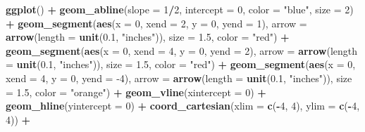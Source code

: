 \documentclass[
]{book}
\newenvironment{Shaded}{\begin{snugshade}}{\end{snugshade}}
\newcommand{\DataTypeTok}[1]{\textcolor[rgb]{0.13,0.29,0.53}{#1}}
\newcommand{\DecValTok}[1]{\textcolor[rgb]{0.00,0.00,0.81}{#1}}
\newcommand{\FloatTok}[1]{\textcolor[rgb]{0.00,0.00,0.81}{#1}}
\newcommand{\KeywordTok}[1]{\textcolor[rgb]{0.13,0.29,0.53}{\textbf{#1}}}
\newcommand{\NormalTok}[1]{#1}
\newcommand{\OperatorTok}[1]{\textcolor[rgb]{0.81,0.36,0.00}{\textbf{#1}}}
\newcommand{\StringTok}[1]{\textcolor[rgb]{0.31,0.60,0.02}{#1}}
\theoremstyle{definition}
\theoremstyle{definition}
\theoremstyle{definition}
\theoremstyle{remark}
\begin{document}
\begin{Shaded}
\begin{Highlighting}[]
\KeywordTok{ggplot}\NormalTok{() }\OperatorTok{+}
\StringTok{    }\KeywordTok{geom_abline}\NormalTok{(}\DataTypeTok{slope =} \DecValTok{1}\OperatorTok{/}\DecValTok{2}\NormalTok{, }\DataTypeTok{intercept =} \DecValTok{0}\NormalTok{, }\DataTypeTok{color =} \StringTok{"blue"}\NormalTok{, }\DataTypeTok{size =} \DecValTok{2}\NormalTok{) }\OperatorTok{+}\StringTok{  }
\StringTok{    }\KeywordTok{geom_segment}\NormalTok{(}\KeywordTok{aes}\NormalTok{(}\DataTypeTok{x =} \DecValTok{0}\NormalTok{, }\DataTypeTok{xend =} \DecValTok{2}\NormalTok{, }\DataTypeTok{y =} \DecValTok{0}\NormalTok{, }\DataTypeTok{yend =} \DecValTok{1}\NormalTok{), }\DataTypeTok{arrow =} \KeywordTok{arrow}\NormalTok{(}\DataTypeTok{length =} \KeywordTok{unit}\NormalTok{(}\FloatTok{0.1}\NormalTok{, }\StringTok{"inches"}\NormalTok{)), }\DataTypeTok{size =} \FloatTok{1.5}\NormalTok{, }\DataTypeTok{color =} \StringTok{"red"}\NormalTok{) }\OperatorTok{+}
\StringTok{    }\KeywordTok{geom_segment}\NormalTok{(}\KeywordTok{aes}\NormalTok{(}\DataTypeTok{x =} \DecValTok{0}\NormalTok{, }\DataTypeTok{xend =} \DecValTok{4}\NormalTok{, }\DataTypeTok{y =} \DecValTok{0}\NormalTok{, }\DataTypeTok{yend =} \DecValTok{2}\NormalTok{), }\DataTypeTok{arrow =} \KeywordTok{arrow}\NormalTok{(}\DataTypeTok{length =} \KeywordTok{unit}\NormalTok{(}\FloatTok{0.1}\NormalTok{, }\StringTok{"inches"}\NormalTok{)), }\DataTypeTok{size =} \FloatTok{1.5}\NormalTok{, }\DataTypeTok{color =} \StringTok{"red"}\NormalTok{) }\OperatorTok{+}
\StringTok{    }\KeywordTok{geom_segment}\NormalTok{(}\KeywordTok{aes}\NormalTok{(}\DataTypeTok{x =} \DecValTok{0}\NormalTok{, }\DataTypeTok{xend =} \DecValTok{4}\NormalTok{, }\DataTypeTok{y =} \DecValTok{0}\NormalTok{, }\DataTypeTok{yend =} \DecValTok{-4}\NormalTok{), }\DataTypeTok{arrow =} \KeywordTok{arrow}\NormalTok{(}\DataTypeTok{length =} \KeywordTok{unit}\NormalTok{(}\FloatTok{0.1}\NormalTok{, }\StringTok{"inches"}\NormalTok{)), }\DataTypeTok{size =} \FloatTok{1.5}\NormalTok{, }\DataTypeTok{color =} \StringTok{"orange"}\NormalTok{) }\OperatorTok{+}
\StringTok{    }\KeywordTok{geom_vline}\NormalTok{(}\DataTypeTok{xintercept =} \DecValTok{0}\NormalTok{) }\OperatorTok{+}\StringTok{ }
\StringTok{    }\KeywordTok{geom_hline}\NormalTok{(}\DataTypeTok{yintercept =} \DecValTok{0}\NormalTok{) }\OperatorTok{+}
\StringTok{    }\KeywordTok{coord_cartesian}\NormalTok{(}\DataTypeTok{xlim =} \KeywordTok{c}\NormalTok{(}\OperatorTok{-}\DecValTok{4}\NormalTok{, }\DecValTok{4}\NormalTok{), }\DataTypeTok{ylim =} \KeywordTok{c}\NormalTok{(}\OperatorTok{-}\DecValTok{4}\NormalTok{, }\DecValTok{4}\NormalTok{))  }\OperatorTok{+}

\end{Highlighting}
\end{Shaded}
\end{document}
